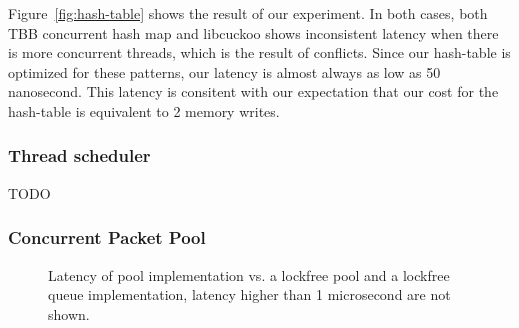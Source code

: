 Figure~\ref{fig:hash-table} shows the result of our experiment. In both cases,
both TBB concurrent hash map and libcuckoo shows inconsistent latency when
there is more concurrent threads, which is the result of conflicts. Since our
hash-table is optimized for these patterns, our latency is almost always as low
as 50 nanosecond. This latency is consitent with our expectation that our cost
for the hash-table is equivalent to 2 memory writes.

\subsubsection{Thread scheduler}
TODO

\subsubsection{Concurrent Packet Pool}
\begin{figure}[ht]
  \centering
  \caption{Latency of pool implementation vs. a lockfree pool and a lockfree queue
    implementation, latency higher than 1 microsecond are not shown\label{fig:pool}.}
  \end{figure}

